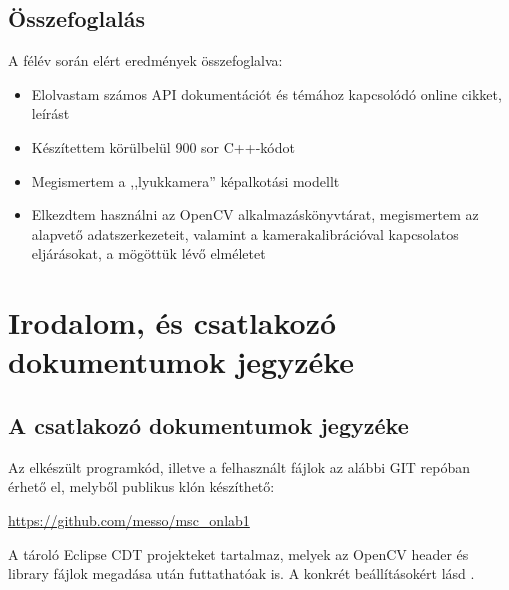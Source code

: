 \documentclass[a4paper,oneside]{article}
\begin{document}
\subsection{Összefoglalás}
\label{sec:osszefoglalas}

A félév során elért eredmények összefoglalva:
\begin{itemize}
\item Elolvastam számos API dokumentációt és témához kapcsolódó online cikket, leírást
\item Készítettem körülbelül 900 sor C++-kódot
\item Megismertem a ,,lyukkamera'' képalkotási modellt
\item Elkezdtem használni az OpenCV alkalmazáskönyvtárat, megismertem az alapvető adatszerkezeteit, valamint a kamerakalibrációval kapcsolatos eljárásokat, a mögöttük lévő elméletet
\end{itemize}
\newpage
 
\section{Irodalom, és csatlakozó dokumentumok jegyzéke}
\label{sec:irod-es-csatl}

\printbibliography[title={Irodalomjegyzék}]

\subsection{A csatlakozó dokumentumok jegyzéke}
\label{sec:csat-irod}

Az elkészült programkód, illetve a felhasznált fájlok az alábbi GIT repóban érhető el, melyből publikus klón készíthető:
\begin{center}
\url{https://github.com/messo/msc_onlab1}
\end{center}

A tároló Eclipse CDT projekteket tartalmaz, melyek az OpenCV header és library fájlok megadása után futtathatóak is. A konkrét beállításokért lásd \cite{opencv-eclipse-cdt}.
\end{document}
